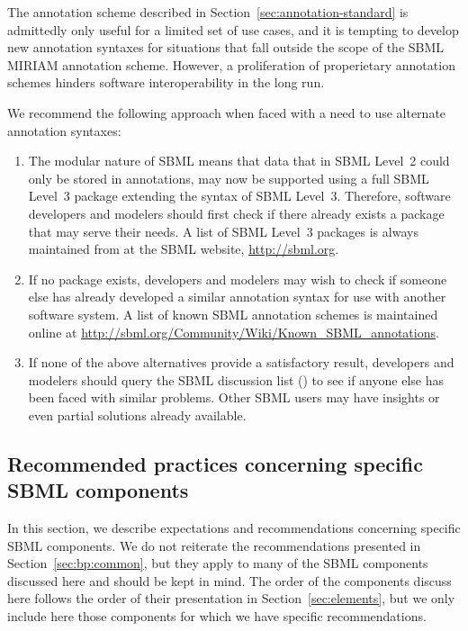 The annotation scheme described in
Section~\ref{sec:annotation-standard} is admittedly only useful
for a limited set of use cases, and it is tempting to develop new
annotation syntaxes for situations that fall outside the scope of
the SBML MIRIAM annotation scheme.  However, a proliferation of
properietary annotation schemes hinders software interoperability
in the long run.

We recommend the following approach when faced with a need to use
alternate annotation syntaxes:
\begin{enumerate}

\item The modular nature of SBML \thisLV means that data that in
  SBML Level~2 could only be stored in annotations, may now be
  supported using a full SBML Level~3 package extending the syntax
  of SBML Level~3.  Therefore, software developers and modelers
  should first check if there already exists a package that may
  serve their needs.  A list of SBML Level~3 packages is always
  maintained from at the SBML website, \url{http://sbml.org}.
  
\item If no package exists, developers and modelers may wish to
  check if someone else has already developed a similar annotation
  syntax for use with another software system.  A list of known
  SBML annotation schemes is maintained online at 
  \url{http://sbml.org/Community/Wiki/Known_SBML_annotations}.

\item If none of the above alternatives provide a satisfactory
  result, developers and modelers should query the SBML discussion
  list ()
  to see if anyone else has been faced with similar problems.
  Other SBML users may have insights or even partial solutions
  already available.

\end{enumerate}


\subsection{Recommended practices concerning specific SBML components}
\label{sec:bp:specifics}

In this section, we describe expectations and recommendations
concerning specific SBML components.  We do not reiterate the
recommendations presented in Section~\ref{sec:bp:common}, but they
apply to many of the SBML components discussed here and should be
kept in mind.  The order of the components discuss here follows
the order of their presentation in Section~\ref{sec:elements}, but
we only include here those components for which we have specific
recommendations.


